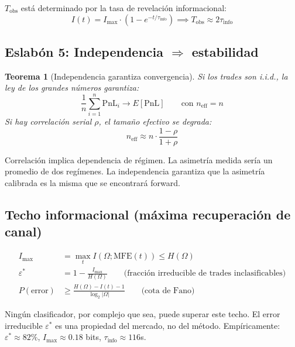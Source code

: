 \documentclass[11pt,a4paper]{article}
\newtheorem{theorem}{Teorema}
\begin{document}
$T_{\text{obs}}$ está determinado por la tasa de revelación informacional:
\begin{equation}
I(t) = I_{\max} \cdot (1 - e^{-t/\tau_{\text{info}}}) \implies T_{\text{obs}} \approx 2\tau_{\text{info}}
\end{equation}
 
\subsection{Eslabón 5: Independencia $\Rightarrow$ estabilidad}
 
\begin{theorem}[Independencia garantiza convergencia]
Si los trades son i.i.d., la ley de los grandes números garantiza:
\begin{equation}
\frac{1}{n}\sum_{i=1}^n \text{PnL}_i \to E[\text{PnL}] \qquad \text{con } n_{\text{eff}} = n
\end{equation}
Si hay correlación serial $\rho$, el tamaño efectivo se degrada:
\begin{equation}
n_{\text{eff}} \approx n \cdot \frac{1-\rho}{1+\rho}
\end{equation}
\end{theorem}
 
Correlación implica dependencia de régimen. La asimetría medida sería un promedio de dos regímenes. La independencia garantiza que la asimetría calibrada es la misma que se encontrará forward.
 
\subsection{Techo informacional (máxima recuperación de canal)}
 
\begin{align}
I_{\max} &= \max_t I(\Omega; \text{MFE}(t)) \leq H(\Omega) \\
\varepsilon^* &= 1 - \frac{I_{\max}}{H(\Omega)} \qquad \text{(fracción irreducible de trades inclasificables)} \\
P(\text{error}) &\geq \frac{H(\Omega) - I(t) - 1}{\log_2 |\Omega|} \qquad \text{(cota de Fano)}
\end{align}
 
Ningún clasificador, por complejo que sea, puede superar este techo. El error irreducible $\varepsilon^*$ es una propiedad del mercado, no del método. Empíricamente: $\varepsilon^* \approx 82\%$, $I_{\max} \approx 0.18$ bits, $\tau_{\text{info}} \approx 116$s.
 
\end{document}
